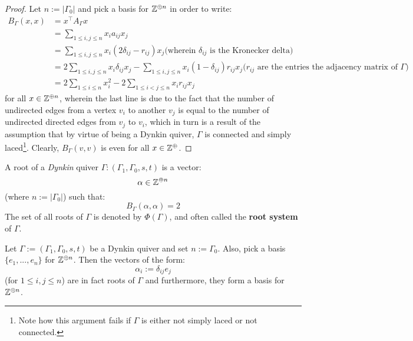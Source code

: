                 \begin{proof}
                    Let $n := |\Gamma_0|$ and pick a basis for $\mathbb{Z}^{\oplus n}$ in order to write:
                        $$
                            \begin{aligned}
                                B_{\Gamma}(x, x) & = x^{\top} A_{\Gamma} x
                                \\
                                & = \sum_{1 \leq i, j \leq n} x_i a_{ij} x_j
                                \\
                                & = \sum_{1 \leq i, j \leq n} x_i (2\delta_{ij} - r_{ij}) x_j \text{(wherein $\delta_{ij}$ is the Kronecker delta)}
                                \\
                                & = 2\sum_{1 \leq i, j \leq n} x_i \delta_{ij} x_j - \sum_{1 \leq i, j \leq n} x_i (1 - \delta_{ij}) r_{ij} x_j \text{($r_{ij}$ are the entries the adjacency matrix of $\Gamma$)}
                                \\
                                & = 2\sum_{1 \leq i \leq n} x_i^2 - 2\sum_{1 \leq i < j \leq n} x_i r_{ij} x_j
                            \end{aligned}
                        $$
                    for all $x \in \mathbb{Z}^{\oplus n}$, wherein the last line is due to the fact that the number of undirected edges from a vertex $v_i$ to another $v_j$ is equal to the number of undirected directed edges from $v_j$ to $v_i$, which in turn is a result of the assumption that by virtue of being a Dynkin quiver, $\Gamma$ is connected and simply laced\footnote{Note how this argument fails if $\Gamma$ is either not simply laced or not connected.}. Clearly, $B_{\Gamma}(v, v)$ is even for all $x \in \mathbb{Z}^{\oplus}$.
                \end{proof}
            \begin{definition}[Roots] \label{def: roots_of_dynkin_quivers}
                A root of a \textit{Dynkin} quiver $\Gamma : (\Gamma_1, \Gamma_0, s, t)$ is a vector:
                    $$\alpha \in \mathbb{Z}^{\oplus n}$$
                (where $n := |\Gamma_0|$) such that:
                    $$B_{\Gamma}(\alpha, \alpha) = 2$$
                The set of all roots of $\Gamma$ is denoted by $\Phi(\Gamma)$, and often called the \textbf{root system} of $\Gamma$.
            \end{definition}
            \begin{example} \label{example: simple_roots}
                Let $\Gamma := (\Gamma_1, \Gamma_0, s, t)$ be a Dynkin quiver and set $n := \Gamma_0$. Also, pick a basis $\{e_1, ..., e_n\}$ for $\mathbb{Z}^{\oplus n}$. Then the vectors of the form:
                    $$\alpha_i := \delta_{ij} e_j$$
                (for $1 \leq i, j \leq n$) are in fact roots of $\Gamma$ and furthermore, they form a basis for $\mathbb{Z}^{\oplus n}$.
            \end{example}
